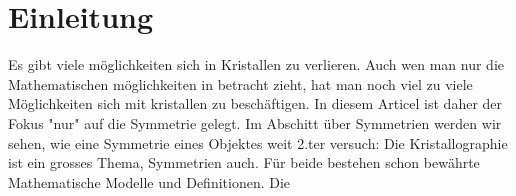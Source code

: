 \section{Einleitung}
Es gibt viele möglichkeiten sich in Kristallen zu verlieren.
Auch wen man nur die Mathematischen möglichkeiten in betracht zieht, hat man noch viel zu viele Möglichkeiten sich mit kristallen zu beschäftigen.
In diesem Articel ist daher der Fokus "nur" auf die Symmetrie gelegt.
Im Abschitt über Symmetrien werden wir sehen, wie eine Symmetrie eines Objektes weit 
2.ter versuch:
Die Kristallographie ist ein grosses Thema, Symmetrien auch. 
Für beide bestehen schon bewährte Mathematische Modelle und Definitionen.
Die

